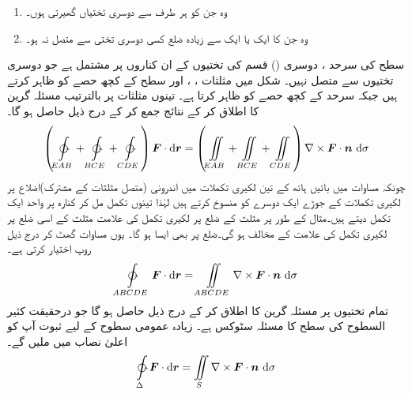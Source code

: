\begin{enumerate}[1.]
\item 
وہ  جن  کو ہر طرف سے  دوسری  تختیاں گھیرتی ہوں۔
\item 
وہ جن کا ایک یا ایک سے زیادہ  ضلع     کسی دوسری  تختی  سے متصل نہ ہو۔
\end{enumerate}

سطح     کی سرحد ،      دوسری  () قسم کی  تختیوں  کے ان کناروں پر مشتمل ہے جو دوسری تختیوں  سے متصل نہیں۔ شکل  میں مثلثات   ، ، اور  سطح   کے کچھ حصے کو ظاہر کرتے ہیں جبکہ  سرحد  کے کچھ حصے کو ظاہر کرتا ہے۔ تینوں مثلثات  پر بالترتیب مسئلہ گرین کا اطلاق کر کے نتائج جمع کر کے درج ذیل حاصل ہو گا۔
\begin{align}\label{مساوات_سمتی_میدان_کثیر_سطحی_سات}
\left(\ointctrclockwise\limits_{EAB}+\ointctrclockwise\limits_{BCE}+\ointctrclockwise\limits_{CDE}\right) \kvec{F}\cdot \dif \kvec{r}=
\left( \iint \limits_{EAB}+\iint\limits_{BCE}+\iint\limits_{CDE}\right)\nabla \times \kvec{F}\cdot \an\, \dif\sigma
\end{align}
چونکہ مساوات   میں  بائیں ہاتھ کے تین لکیری تکملات میں  اندرونی   (متصل  مثلثات کے مشترک)اضلاع  پر  لکیری تکملات  کے جوڑے ایک دوسرے کو منسوخ کرتے  ہیں لہٰذا  تینوں تکمل    مل کر  کنارہ  پر   واحد ایک  تکمل دیتے ہیں۔مثال کے طور پر  مثلث  کے ضلع   پر لکیری تکمل کی علامت  مثلث  کے اسی ضلع پر لکیری تکمل کی علامت  کے مخالف  ہو گی۔ضلع  پر بھی ایسا ہو گا۔ یوں مساوات    گھٹ کر    درج ذیل روپ اختیار کرتی ہے۔
\begin{align*}
\ointctrclockwise\limits_{ABCDE} \kvec{F}\cdot \dif \kvec{r}=\iint\limits_{ABCDE}\nabla \times \kvec{F}\cdot \an\, \dif\sigma
\end{align*}
تمام تختیوں  پر مسئلہ گرین کا اطلاق کر کے درج ذیل حاصل ہو گا جو  درحقیقت کثیر  السطوح    کی   سطح  کا مسئلہ سٹوکس ہے۔ زیادہ عمومی  سطوح کے   لیے   ثبوت آپ کو   اعلیٰ نصاب  میں  ملیں گے۔
\begin{align*}
\ointctrclockwise\limits_{\Delta} \kvec{F}\cdot \dif\kvec{r}=\iint\limits_{S}\nabla \times \kvec{F}\cdot \an\, \dif\sigma
\end{align*}


